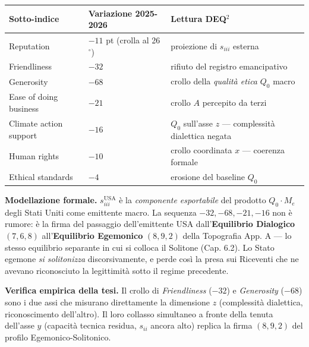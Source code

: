 {\def\LTcaptype{none} %
{\small\begin{longtable}[]{@{}
  >{\raggedright\arraybackslash}p{}
  >{\raggedright\arraybackslash}p{}
  >{\raggedright\arraybackslash}p{}@{}}
\toprule\noalign{}
\begin{minipage}[b]{\linewidth}\raggedright
Sotto-indice
\end{minipage} & \begin{minipage}[b]{\linewidth}\raggedright
Variazione 2025-2026
\end{minipage} & \begin{minipage}[b]{\linewidth}\raggedright
Lettura DEQ$^2$
\end{minipage} \\
\midrule\noalign{}
\endhead
\bottomrule\noalign{}
\endlastfoot
Reputation & \(-11\) pt (crolla al 26$^\circ$) & proiezione di \(s_{iii}\)
esterna \\
Friendliness & \(-32\) & rifiuto del registro emancipativo \\
Generosity & \(-68\) & crollo della \emph{qualità etica} \(Q_0\)
macro \\
Ease of doing business & \(-21\) & crollo \(A\) percepito da terzi \\
Climate action support & \(-16\) & \(Q_0\) sull'asse \(z\) ---
complessità dialettica negata \\
Human rights & \(-10\) & crollo coordinata \(x\) --- coerenza formale \\
Ethical standards & \(-4\) & erosione del baseline \(Q_0\) \\
\end{longtable}}
}

\Hypoth{} \textbf{Modellazione formale.} \(s_{iii}^{\text{USA}}\) è la
\emph{componente esportabile} del prodotto \(Q_0 \cdot M_e\) degli Stati
Uniti come emittente macro. La sequenza \(-32, -68, -21, -16\) non è
rumore: è la firma del passaggio dell'emittente USA
dall'\textbf{Equilibrio Dialogico} \((7, 6, 8)\) all'\textbf{Equilibrio
Egemonico} \((8, 9, 2)\) della Topografia App. A --- lo stesso
equilibrio separante in cui si colloca il Solitone (Cap. 6.2). Lo Stato
egemone \emph{si solitonizza} discorsivamente, e perde così la presa sui
Riceventi che ne avevano riconosciuto la legittimità sotto il regime
precedente.

\Proved{} \textbf{Verifica empirica della tesi.} Il crollo di
\emph{Friendliness} (\(-32\)) e \emph{Generosity} (\(-68\)) sono i due
assi che misurano direttamente la dimensione \(z\) (complessità
dialettica, riconoscimento dell'altro). Il loro collasso simultaneo a
fronte della tenuta dell'asse \(y\) (capacità tecnica residua,
\(s_{ii}\) ancora alto) replica la firma \((8, 9, 2)\) del profilo
Egemonico-Solitonico.



